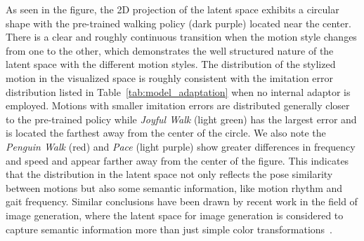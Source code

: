 As seen in the figure, the 2D projection of the latent space 
exhibits a circular shape with the pre-trained walking policy (dark purple) located near the center. 
There is a clear and roughly continuous transition when the motion style changes from one to the other,
which demonstrates the well structured nature of the latent space %
with the different motion styles.
The distribution of the stylized motion in the visualized %
space 
is roughly consistent with the imitation error distribution listed in Table~\ref{tab:model_adaptation} when no 
internal adaptor is employed.
Motions with smaller imitation errors are distributed generally closer to the pre-trained policy while
\textit{Joyful Walk} (light green) has the largest error and is located the farthest away from the center of the circle. 
We also note the \textit{Penguin Walk} (red) and \textit{Pace} (light purple) show greater differences in frequency and speed and %
appear farther away from the center of the figure. 
This indicates that the distribution in the latent space not only reflects the pose similarity between motions but also some semantic information, like motion rhythm and gait frequency.
Similar conclusions have been drawn by recent work %
in the field of image generation, where the latent space for image generation is considered to capture semantic information more than just simple color transformations~\cite{Jahanian2020On,epstein2022blobgan,shen2020interpreting}.  
